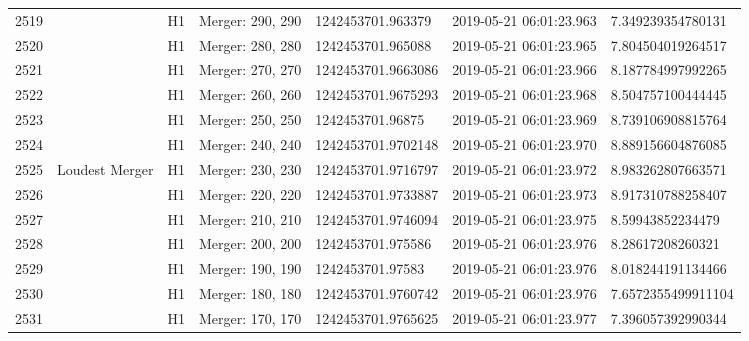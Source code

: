 \begin{longtable}{lllllll}
2519 &                                                    &       H1 &  Merger: 290, 290 &   1242453701.963379 &  2019-05-21 06:01:23.963 &   7.349239354780131 \\
2520 &                                                    &       H1 &  Merger: 280, 280 &   1242453701.965088 &  2019-05-21 06:01:23.965 &   7.804504019264517 \\
2521 &                                                    &       H1 &  Merger: 270, 270 &  1242453701.9663086 &  2019-05-21 06:01:23.966 &   8.187784997992265 \\
2522 &                                                    &       H1 &  Merger: 260, 260 &  1242453701.9675293 &  2019-05-21 06:01:23.968 &   8.504757100444445 \\
2523 &                                                    &       H1 &  Merger: 250, 250 &    1242453701.96875 &  2019-05-21 06:01:23.969 &   8.739106908815764 \\
2524 &                                                    &       H1 &  Merger: 240, 240 &  1242453701.9702148 &  2019-05-21 06:01:23.970 &   8.889156604876085 \\
2525 &                                     Loudest Merger &       H1 &  Merger: 230, 230 &  1242453701.9716797 &  2019-05-21 06:01:23.972 &   8.983262807663571 \\
2526 &                                                    &       H1 &  Merger: 220, 220 &  1242453701.9733887 &  2019-05-21 06:01:23.973 &   8.917310788258407 \\
2527 &                                                    &       H1 &  Merger: 210, 210 &  1242453701.9746094 &  2019-05-21 06:01:23.975 &    8.59943852234479 \\
2528 &                                                    &       H1 &  Merger: 200, 200 &   1242453701.975586 &  2019-05-21 06:01:23.976 &    8.28617208260321 \\
2529 &                                                    &       H1 &  Merger: 190, 190 &    1242453701.97583 &  2019-05-21 06:01:23.976 &   8.018244191134466 \\
2530 &                                                    &       H1 &  Merger: 180, 180 &  1242453701.9760742 &  2019-05-21 06:01:23.976 &  7.6572355499911104 \\
2531 &                                                    &       H1 &  Merger: 170, 170 &  1242453701.9765625 &  2019-05-21 06:01:23.977 &   7.396057392990344 \\

\end{longtable}
